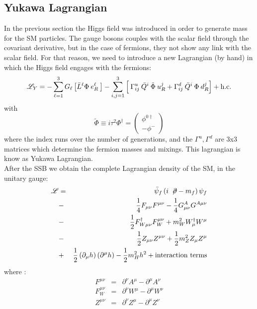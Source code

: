 \subsection{Yukawa Lagrangian}

In the previous section the Higgs field was introduced in order to generate mass for the SM particles. The gauge bosons couples with the scalar field through the covariant derivative, but in the case of fermions, they not show 
any link with the scalar field. For that reason, we need to
introduce a new Lagrangian (by hand) in which the Higgs field engages with the fermions: 
\begin{equation}\label{yukawa}
\mathscr{L}_{Y}=-\sum_{\ell=1}^{3} G_{\ell}\left[\bar{L}^{\ell}\Phi\:e^{\ell}_{R}\:\right]- \sum_{i,j=1}^{3}\left[\:\Gamma^{u}_{ij}\:\bar{Q}^{i}\:\tilde{\Phi}\:u^{j}_{R} + \Gamma^{d}_{ij}\:\bar{Q}^{i}\:\Phi\: d^{j}_{R}  \right]  
+\hbox{h.c.} 
\end{equation}
with
\begin{equation}
\tilde{\Phi} \equiv i\tau^{2}\Phi^{\dag}=\left(\begin{array}{c}
\phi^{0 \dag}\\
-\phi^{-}
\end{array}\right) 
\end{equation}
where the index runs over the number of generations, and the $\Gamma^{u},\Gamma^{d}$ are 3x3 matrices which determine the fermion masses and mixings.
This lagrangian is know as Yukawa Lagrangian.\\
After the SSB we obtain the complete Lagrangian density of the SM, in the unitary gauge:
\begin{eqnarray}
\mathscr{L} &=& \bar{\psi}_{f}\left(i \:\not\! \partial-m_{f} \right)\psi_{f}\nonumber\\
&-&\dfrac{1}{4}F_{\mu\nu}F^{\mu\nu}-\dfrac{1}{4}G^{A}_{\mu\nu}G^{A \mu\nu}\nonumber\\
&-&\dfrac{1}{2}F^{\dag}_{W \mu\nu}F^{\mu\nu}_{W} + m_{W}^{2}W^{\dag}_{\mu}W^{\mu}\nonumber\\
&-&\dfrac{1}{2}Z_{\mu\nu}Z^{\mu\nu} +\dfrac{1}{2}m_{Z}^{2}Z_{\mu}Z^{\mu}\nonumber\\
&+& \dfrac{1}{2} \left(\partial_{\mu} h \right)\left(\partial^{\mu} h \right)- \dfrac{1}{2} m_{H}^{2}h^{2} + \text{interaction terms}   
\end{eqnarray}
where :
\begin{eqnarray}
F^{\mu\nu} &=& \partial^{\nu}A^{\mu}-\partial^{\mu}A^{\nu} \nonumber\\
F^{\mu\nu}_{W} &=& \partial^{\nu}W^{\mu}-\partial^{\mu}W^{\nu} \nonumber\\
Z^{\mu\nu} &=& \partial^{\nu}Z^{\mu}-\partial^{\mu}Z^{\nu}
\end{eqnarray}
